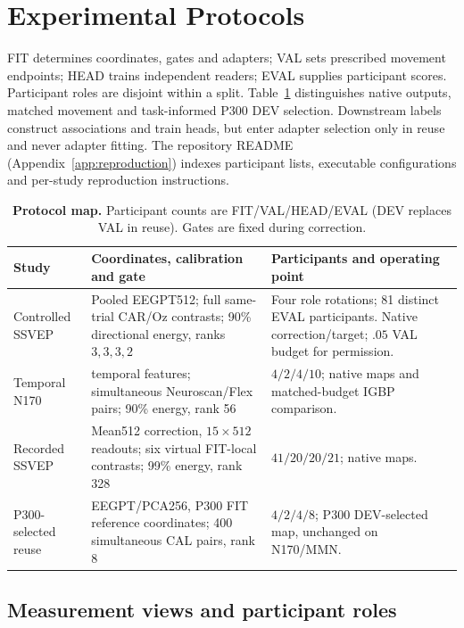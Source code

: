 \section{Experimental Protocols}
\label{app:protocols}
\label{app:protocol}
FIT determines coordinates, gates and adapters; VAL sets prescribed movement
endpoints; HEAD trains independent readers; EVAL supplies participant scores.
Participant roles are disjoint within a split. Table~\ref{tab:protocol-map}
distinguishes native outputs, matched movement and task-informed P300 DEV
selection. Downstream labels construct associations and train heads, but
enter adapter selection only in reuse and never adapter fitting.
The repository README (Appendix~\ref{app:reproduction}) indexes participant
lists, executable configurations and per-study reproduction instructions.

\begin{table}[htbp]
\centering\small
\caption{\textbf{Protocol map.} Participant counts are FIT/VAL/HEAD/EVAL
(DEV replaces VAL in reuse). Gates are fixed during correction.}
\label{tab:protocol-map}
\begin{tabular}{@{}>{\raggedright\arraybackslash}p{.18\linewidth}>{\raggedright\arraybackslash}p{.43\linewidth}>{\raggedright\arraybackslash}p{.33\linewidth}@{}}
\toprule
Study & Coordinates, calibration and gate & Participants and operating point \\
\midrule
Controlled SSVEP & Pooled EEGPT512; full same-trial CAR/Oz contrasts;
90\% directional energy, ranks $3,3,3,2$ & Four role rotations;
81 distinct EVAL participants. Native correction/target; $.05$ VAL budget for permission. \\
\addlinespace
Temporal N170 & 240 temporal features; simultaneous Neuroscan/Flex pairs;
90\% energy, rank 56 & $4/2/4/10$; native maps and matched-budget IGBP comparison. \\
\addlinespace
Recorded SSVEP & Mean512 correction, $15\times512$ readouts;
six virtual FIT-local contrasts; 99\% energy, rank 328 & $41/20/20/21$;
native maps. \\
\addlinespace
P300-selected reuse & EEGPT/PCA256, P300 FIT reference coordinates;
400 simultaneous CAL pairs, rank 8 & $4/2/4/8$;
P300 DEV-selected map, unchanged on N170/MMN. \\
\bottomrule
\end{tabular}
\end{table}

\subsection{Measurement views and participant roles}
